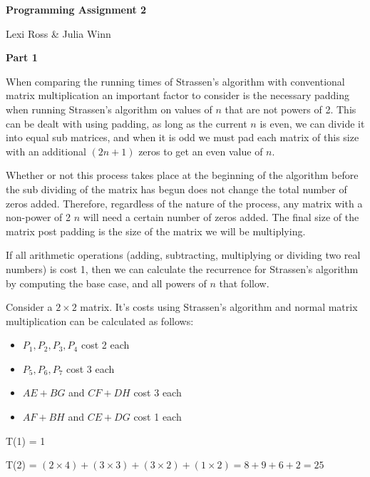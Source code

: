 \documentclass[12pt]{article}
\begin{document}
\begin{center} \textbf{Programming Assignment 2} \end{center}
 \vspace{-7mm} 
\begin{flushright} Lexi Ross \& Julia Winn  \end{flushright}

 \vspace{-4mm} 
\noindent \textbf{Part 1}
\medskip

\noindent When comparing the running times of Strassen's algorithm with conventional matrix multiplication an important factor to consider is the necessary padding when running Strassen's algorithm on values of $n$ that are not powers of 2.  This can be dealt with using padding, as long as the current $n$ is even, we can divide it into equal sub matrices, and when it is odd we must pad each matrix of this size with an additional $(2n+1)$ zeros to get an even value of $n$.
\medskip

\noindent Whether or not this process takes place at the beginning of the algorithm before the sub dividing of the matrix has begun does not change the total number of zeros added.  Therefore, regardless of the nature of the process, any matrix with a non-power of 2 $n$ will need a certain number of zeros added.  The final size of the matrix post padding is the size of the matrix we will be multiplying.
\medskip

\noindent If all arithmetic operations (adding, subtracting, multiplying or dividing two real numbers) is cost 1, then we can calculate the recurrence for Strassen's algorithm by computing the base case, and all powers of $n$ that follow.
\medskip

\noindent Consider a $2 \times 2$ matrix.  It's costs using Strassen's algorithm and normal matrix multiplication can be calculated as follows:

\begin{itemize}
\item $P_1, P_2, P_3, P_4$ cost 2 each
\item $P_5, P_6, P_7$ cost 3 each
\item $AE + BG$ and $CF + DH$ cost 3 each
\item $AF + BH$ and $CE + DG$ cost 1 each
\end{itemize}

\noindent T(1) = 1
\medskip

\noindent T(2) = $(2 \times 4) + (3 \times 3) + (3 \times 2) + (1 \times 2)= 8 + 9 + 6 + 2 = 25$
\medskip
\end{document}
